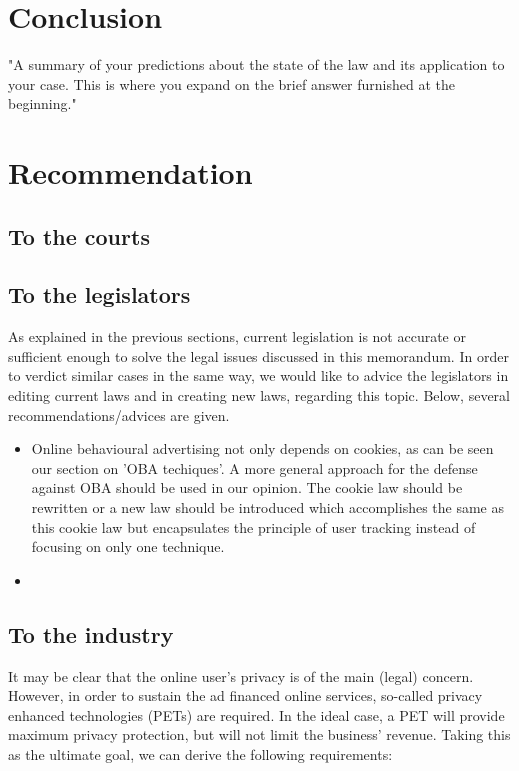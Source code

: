 \documentclass[11pt]{article}
\begin{document}
\section{Conclusion}
"A summary of your predictions about the state of the law and its application to your case.
This is where you expand on the brief answer furnished at the beginning."



\section{Recommendation}
\subsection{To the courts}
\subsection{To the legislators}
As explained in the previous sections, current legislation is not accurate or sufficient enough to solve the legal issues discussed in this memorandum. In order to verdict similar cases in the same way, we would like to advice the legislators in editing current laws and in creating new laws, regarding this topic. Below, several recommendations/advices are given.

\begin{itemize}
	\item Online behavioural advertising not only depends on cookies, as can be seen our section on 'OBA techiques'. A more general approach for the defense against OBA should be used in our opinion. The cookie law \cite{cookie dinges cite wheet ik veel hoe die heet?} should be rewritten or a new law should be introduced which accomplishes the same as this cookie law but encapsulates the principle of user tracking instead of focusing on only one technique.
	\item 
\end{itemize}

\subsection{To the industry}
It may be clear that the online user's privacy is of the main (legal) concern. However, in order to sustain the ad financed online services, so-called privacy enhanced technologies (PETs) are required. In the ideal case, a PET will provide maximum privacy protection, but will not limit the business' revenue. Taking this as the ultimate goal, we can derive the following requirements:
\end{document}
